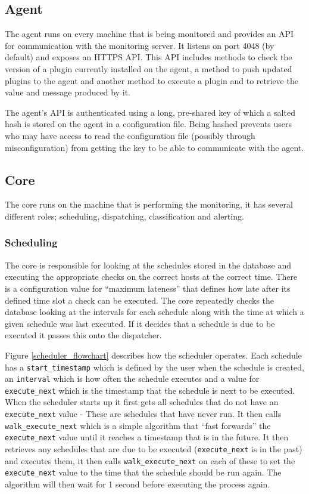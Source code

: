 \documentclass[bsc,logo,twoside,parskip,singlespacing,notimes]{infthesis}
\begin{document}
\subsection{Agent}

	The agent runs on every machine that is being monitored and provides an API for
	communication with the monitoring server.  It listens on port 4048 (by default)
	and exposes an HTTPS API.  This API includes methods to check the version of a
	plugin currently installed on the agent, a method to push updated plugins to
	the agent and another method to execute a plugin and to retrieve the value and
	message produced by it.


	The agent's API is authenticated using a long, pre-shared key of which a salted
	hash is stored on the agent in a configuration file.  Being hashed prevents
	users who may have access to read the configuration file (possibly through
	misconfiguration) from getting the key to be able to communicate with the
	agent.

\subsection{Core}

	The core runs on the machine that is performing the monitoring, it has several
	different roles; scheduling, dispatching, classification and alerting.

\subsubsection{Scheduling}

	The core is responsible for looking at the schedules stored in the database and
	executing the appropriate checks on the correct hosts at the correct time.
	There is a configuration value for ``maximum lateness'' that defines how late
	after its defined time slot a check can be executed.  The core repeatedly
	checks the database looking at the intervals for each schedule along with the
	time at which a given schedule was last executed.  If it decides that a
	schedule is due to be executed it passes this onto the dispatcher.


	Figure \ref{scheduler_flowchart} describes how the scheduler operates.  Each
	schedule has a \linebreak\texttt{start\_timestamp} which is defined by the user
	when the schedule is created, an \texttt{interval} which is how often the
	schedule executes and a value for \texttt{execute\_next} which is the timestamp
	that the schedule is next to be executed.  When the scheduler starts up it
	first gets all schedules that do not have an \texttt{execute\_next} value -
	These are schedules that have never run.  It then calls
	\texttt{walk\_execute\_next} which is a simple algorithm that ``fast forwards''
	the \texttt{execute\_next} value until it reaches a timestamp that is in the
	future.  It then retrieves any schedules that are due to be executed
	(\texttt{execute\_next} is in the past) and executes them, it then calls
	\texttt{walk\_execute\_next} on each of these to set the \texttt{execute\_next}
	value to the time that the schedule should be run again.  The algorithm will
	then wait for 1 second before executing the process again.
\end{document}
